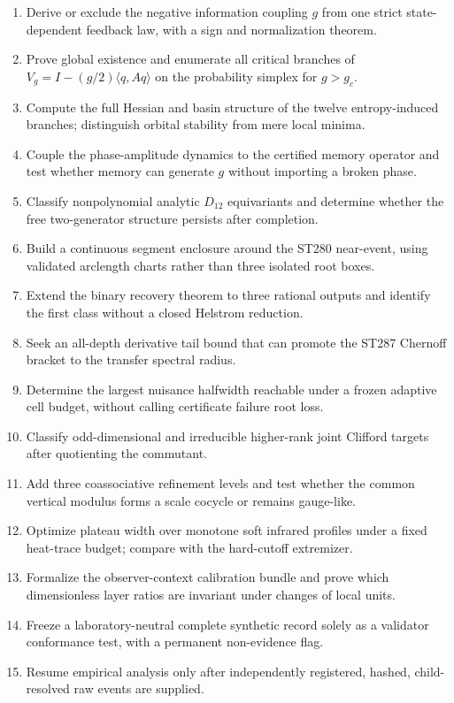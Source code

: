 \documentclass[11pt,a4paper]{article}
\begin{document}
\begin{enumerate}
\item[\textbf{ST293}.] Derive or exclude the negative information coupling $g$ from one
strict state-dependent feedback law, with a sign and normalization theorem.
\item[\textbf{ST294}.] Prove global existence and enumerate all critical branches of
$V_g=I-(g/2)\langle q,Aq\rangle$ on the probability simplex for $g>g_c$.
\item[\textbf{ST295}.] Compute the full Hessian and basin structure of the twelve
entropy-induced branches; distinguish orbital stability from mere local minima.
\item[\textbf{ST296}.] Couple the phase-amplitude dynamics to the certified memory operator
and test whether memory can generate $g$ without importing a broken phase.
\item[\textbf{ST297}.] Classify nonpolynomial analytic $D_{12}$ equivariants and determine
whether the free two-generator structure persists after completion.
\item[\textbf{ST298}.] Build a continuous segment enclosure around the ST280 near-event,
using validated arclength charts rather than three isolated root boxes.
\item[\textbf{ST299}.] Extend the binary recovery theorem to three rational outputs and
identify the first class without a closed Helstrom reduction.
\item[\textbf{ST300}.] Seek an all-depth derivative tail bound that can promote the ST287
Chernoff bracket to the transfer spectral radius.
\item[\textbf{ST301}.] Determine the largest nuisance halfwidth reachable under a frozen
adaptive cell budget, without calling certificate failure root loss.
\item[\textbf{ST302}.] Classify odd-dimensional and irreducible higher-rank joint Clifford
targets after quotienting the commutant.
\item[\textbf{ST303}.] Add three coassociative refinement levels and test whether the common
vertical modulus forms a scale cocycle or remains gauge-like.
\item[\textbf{ST304}.] Optimize plateau width over monotone soft infrared profiles under a
fixed heat-trace budget; compare with the hard-cutoff extremizer.
\item[\textbf{ST305}.] Formalize the observer-context calibration bundle and prove which
dimensionless layer ratios are invariant under changes of local units.
\item[\textbf{ST306}.] Freeze a laboratory-neutral complete synthetic record solely as a
validator conformance test, with a permanent non-evidence flag.
\item[\textbf{ST307}.] Resume empirical analysis only after independently registered,
hashed, child-resolved raw events are supplied.
\end{enumerate}
\end{document}
